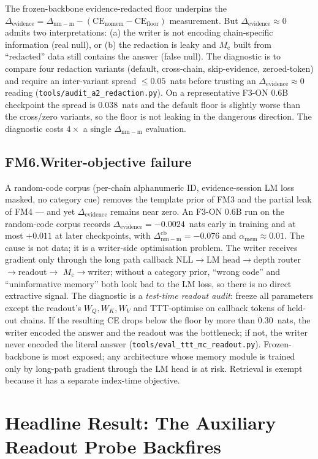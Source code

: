 \documentclass{article}
\newcommand{\Mc}{M_{\mathrm{c}}}
\newcommand{\dnm}{\Delta_{\mathrm{nm-m}}}
\newcommand{\CEnomem}{\mathrm{CE}_{\mathrm{nomem}}}
\newcommand{\CEfloor}{\mathrm{CE}_{\mathrm{floor}}}
\newcommand{\elift}{\Delta_{\mathrm{evidence}}}
\newcommand{\amem}{\alpha_{\mathrm{mem}}}
\begin{document}
The frozen-backbone evidence-redacted floor underpins the
$\elift = \dnm - (\CEnomem - \CEfloor)$ measurement.  But
$\elift \approx 0$ admits two interpretations: (a) the writer is not
encoding chain-specific information (real null), or (b) the
redaction is leaky and $\Mc$ built from ``redacted'' data still
contains the answer (false null).  The diagnostic is to compare four
redaction variants (default, cross-chain, skip-evidence,
zeroed-token) and require an inter-variant spread $\le 0.05$~nats
before trusting an $\elift \approx 0$ reading
(\texttt{tools/audit\_a2\_redaction.py}).  On a representative F3-ON
0.6B checkpoint the spread is $0.038$~nats and the default floor is
slightly worse than the cross/zero variants, so the floor is not
leaking in the dangerous direction.  The diagnostic costs $4\times$
a single $\dnm$ evaluation.

\subsection{FM6.\enspace Writer-objective failure}
\label{sec:fm6}

A random-code corpus (per-chain alphanumeric ID, evidence-session
LM loss masked, no category cue) removes the template prior of FM3
and the partial leak of FM4 --- and yet $\elift$ remains near zero.
An F3-ON 0.6B run on the random-code corpus records
$\elift = -0.0024$~nats early in training and at most $+0.011$ at
later checkpoints, with $\dnm^{\mathrm{cb}} = -0.076$ and
$\amem \approx 0.01$.  The cause is not data; it is a writer-side
optimisation problem.  The writer receives gradient only through the
long path callback NLL$\to$LM head$\to$depth router$\to$readout$\to$
$\Mc\to$writer; without a category prior, ``wrong code'' and
``uninformative memory'' both look bad to the LM loss, so there is
no direct extractive signal.  The diagnostic is a \emph{test-time
readout audit}: freeze all parameters except the readout's
$W_Q,W_K,W_V$ and TTT-optimise on callback tokens of held-out
chains.  If the resulting CE drops below the floor by more than
$0.30$~nats, the writer encoded the answer and the readout was the
bottleneck; if not, the writer never encoded the literal answer
(\texttt{tools/eval\_ttt\_mc\_readout.py}).  Frozen-backbone is most
exposed; any architecture whose memory module is trained only by
long-path gradient through the LM head is at risk.  Retrieval is
exempt because it has a separate index-time objective.

\section{Headline Result: The Auxiliary Readout Probe Backfires}
\label{sec:f3_off}
\end{document}
